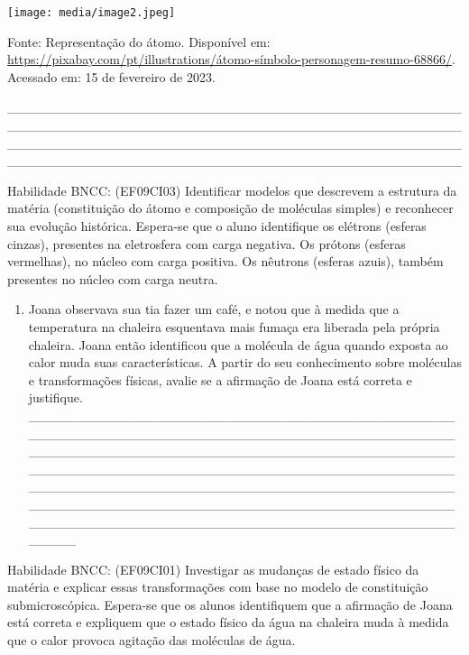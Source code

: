 \texttt{[image: media/image2.jpeg]}

Fonte: Representação do átomo. Disponível em:
\url{https://pixabay.com/pt/illustrations/átomo-símbolo-personagem-resumo-68866/}.
Acessado em: 15 de fevereiro de 2023.

\_\_\_\_\_\_\_\_\_\_\_\_\_\_\_\_\_\_\_\_\_\_\_\_\_\_\_\_\_\_\_\_\_\_\_\_\_\_\_\_\_\_\_\_\_\_\_\_\_\_\_\_\_\_\_\_\_\_\_\_\_\_\_\_\_\_\_\_\_\_\_\_\_\_\_\_\_\_\_\_\_\_\_\_\_\_\_\_\_\_\_\_\_\_\_\_\_\_\_\_\_\_\_\_\_\_\_\_\_\_\_\_\_\_\_\_\_\_\_\_\_\_\_\_\_\_\_\_\_\_\_\_\_\_\_\_\_\_\_\_\_\_\_\_\_\_\_\_\_\_\_\_\_\_\_\_\_\_\_\_\_\_\_\_\_\_\_\_\_\_\_\_\_\_\_\_\_\_\_\_\_\_\_\_\_\_\_\_\_\_\_\_

Habilidade BNCC: (EF09CI03) Identificar modelos que descrevem a
estrutura da matéria (constituição do átomo e composição de moléculas
simples) e reconhecer sua evolução histórica. Espera-se que o aluno
identifique os elétrons (esferas cinzas), presentes na eletrosfera com
carga negativa. Os prótons (esferas vermelhas), no núcleo com carga
positiva. Os nêutrons (esferas azuis), também presentes no núcleo com
carga neutra.

\begin{enumerate}
\def\labelenumi{\arabic{enumi}.}
\item
  Joana observava sua tia fazer um café, e notou que à medida que a
  temperatura na chaleira esquentava mais fumaça era liberada pela
  própria chaleira. Joana então identificou que a molécula de água
  quando exposta ao calor muda suas características. A partir do seu
  conhecimento sobre moléculas e transformações físicas, avalie se a
  afirmação de Joana está correta e justifique.\\
  \_\_\_\_\_\_\_\_\_\_\_\_\_\_\_\_\_\_\_\_\_\_\_\_\_\_\_\_\_\_\_\_\_\_\_\_\_\_\_\_\_\_\_\_\_\_\_\_\_\_\_\_\_\_\_\_\_\_\_\_\_\_\_\_\_\_\_\_\_\_\_\_\_\_\_\_\_\_\_\_\_\_\_\_\_\_\_\_\_\_\_\_\_\_\_\_\_\_\_\_\_\_\_\_\_\_\_\_\_\_\_\_\_\_\_\_\_\_\_\_\_\_\_\_\_\_\_\_\_\_\_\_\_\_\_\_\_\_\_\_\_\_\_\_\_\_\_\_\_\_\_\_\_\_\_\_\_\_\_\_\_\_\_\_\_\_\_\_\_\_\_\_\_\_\_\_\_\_\_\_\_\_\_\_\_\_\_\_\_\_\_\_\_\_\_\_\_\_\_\_\_\_\_\_\_\_\_\_\_\_\_\_\_\_\_\_\_\_\_\_\_\_\_\_\_\_\_\_\_\_\_\_\_\_\_\_\_\_\_\_\_\_\_\_\_\_\_\_\_\_\_\_\_\_\_\_\_\_\_\_\_\_\_\_\_\_\_\_\_\_\_\_\_\_\_\_\_\_\_\_\_\_\_\_\_\_\_\_\_\_\_\_\_\_\_\_\_\_\_\_\_\_\_\_\_\_\_\_\_\_\_\_\_\_\_\_\_\_\_\_
\end{enumerate}

Habilidade BNCC: (EF09CI01) Investigar as mudanças de estado físico da
matéria e explicar essas transformações com base no modelo de
constituição submicroscópica. Espera-se que os alunos identifiquem que a
afirmação de Joana está correta e expliquem que o estado físico da água
na chaleira muda à medida que o calor provoca agitação das moléculas de
água.

